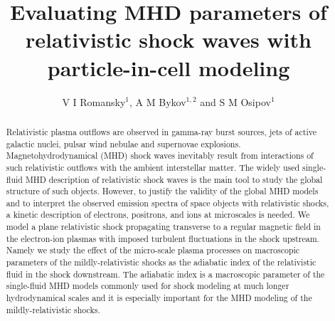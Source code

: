 \documentclass[a4paper]{jpconf}
\begin{document}
	\title{Evaluating MHD parameters of relativistic shock waves with particle-in-cell modeling}
	
	\author{V I Romansky$^{1}$, A M Bykov$^{1,2}$ and S M Osipov$^{1}$}
	
	\address{$^1$ Ioffe Institute, 26 Politekhnicheskaya st., St. Petersburg 194021, Russia}
	\address{$^2$ Peter the Great St. Petersburg Polytechnic University, 29 Politekhnicheskaya st., St. Petersburg 195251, Russia}
	
	
	\begin{abstract}
                 Relativistic plasma outflows are observed in gamma-ray burst 
		sources, jets of active galactic nuclei, pulsar wind nebulae and
		supernovae explosions. Magnetohydrodynamical (MHD) shock waves
		inevitably result from interactions of such relativistic outflows with
		the ambient interstellar matter. The widely used single-fluid MHD
		description of relativistic shock waves is the main tool to study the
		global structure of such objects. However, to justify the validity of 
		the global MHD models and to interpret the observed
		emission spectra of space objects with relativistic shocks, a kinetic
		description of electrons, positrons, and ions at microscales is needed. 
		We model a plane relativistic shock propagating  transverse to a regular magnetic field in the electron-ion plasmas with imposed turbulent fluctuations in the shock upstream.   
           Namely we study  the effect of the micro-scale plasma processes on 
		macroscopic parameters of the mildly-relativistic shocks as the adiabatic index
		of the relativistic fluid in the shock downstream. The adiabatic index is a macroscopic parameter of the
		single-fluid MHD models commonly used for shock modeling at much
		longer hydrodynamical scales and it is especially important for the MHD modeling of the mildly-relativistic shocks.
	\end{abstract}
	
\end{document}
